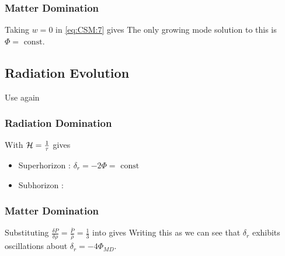 \documentclass{article}
\begin{document}
\subsubsection*{Matter Domination}
Taking $w = 0$ in \ref{eq:CSM:7} gives 
The only growing mode solution to this is $\Phi = \text{ const}$. 


\subsection{Radiation Evolution}

Use again 

\subsubsection*{Radiation Domination}
With $\mathcal{H} = \frac{1}{\tau}$ gives 
\begin{itemize}
    \item Superhorizon : $\delta_r = -2\Phi = \text{ const}$ 
    \item Subhorizon : 
\end{itemize}

\subsubsection*{Matter Domination}

Substituting $\frac{\delta P}{\delta \rho} = \frac{\bar{P}}{\bar{\rho}} = \frac{1}{3} $ into 
gives 
Writing this as 
we can see that $\delta_r$ exhibits oscillations about $\delta_r = -4\Phi_{MD}$. 
\end{document}
